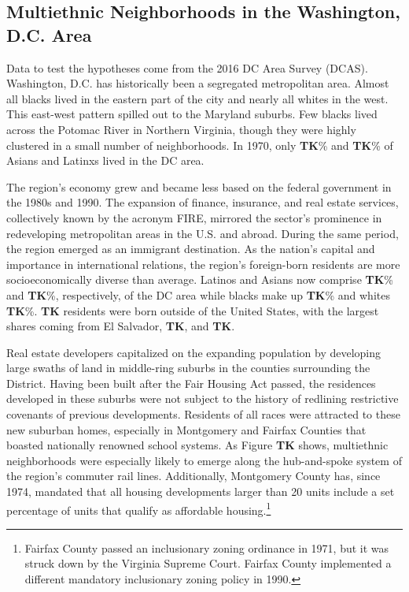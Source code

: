 \documentclass{baderart}
\begin{document}
\subsection{Multiethnic Neighborhoods in the Washington, D.C. Area}\label{multiethnic-neighborhoods-in-the-washington-d.c.-area}

Data to test the hypotheses come from the 2016 DC Area Survey (DCAS). Washington, D.C. has historically been a segregated metropolitan area. Almost all blacks lived in the eastern part of the city and nearly all whites in the west. This east-west pattern spilled out to the Maryland suburbs. Few blacks lived across the Potomac River in Northern Virginia, though they were highly clustered in a small number of neighborhoods. In 1970, only \textbf{TK}\% and \textbf{TK}\% of Asians and Latinxs lived in the DC area.

The region's economy grew and became less based on the federal government in the 1980s and 1990. The expansion of finance, insurance, and real estate services, collectively known by the acronym FIRE, mirrored the sector's prominence in redeveloping metropolitan areas in the U.S. and abroad. During the same period, the region emerged as an immigrant destination. As the nation's capital and importance in international relations, the region's foreign-born residents are more socioeconomically diverse than average. Latinos and Asians now comprise \textbf{TK}\% and \textbf{TK}\%, respectively, of the DC area while blacks make up \textbf{TK}\% and whites \textbf{TK}\%. \textbf{TK} residents were born outside of the United States, with the largest shares coming from El Salvador, \textbf{TK}, and \textbf{TK}.

Real estate developers capitalized on the expanding population by developing large swaths of land in middle-ring suburbs in the counties surrounding the District. Having been built after the Fair Housing Act passed, the residences developed in these suburbs were not subject to the history of redlining restrictive covenants of previous developments. Residents of all races were attracted to these new suburban homes, especially in Montgomery and Fairfax Counties that boasted nationally renowned school systems. As Figure \textbf{TK} shows, multiethnic neighborhoods were especially likely to emerge along the hub-and-spoke system of the region's commuter rail lines. Additionally, Montgomery County has, since 1974, mandated that all housing developments larger than 20 units include a set percentage of units that qualify as affordable housing.\footnote{Fairfax County passed an inclusionary   zoning ordinance in 1971, but it was struck down by the Virginia   Supreme Court. Fairfax County implemented a different mandatory   inclusionary zoning policy in 1990.}
\end{document}
